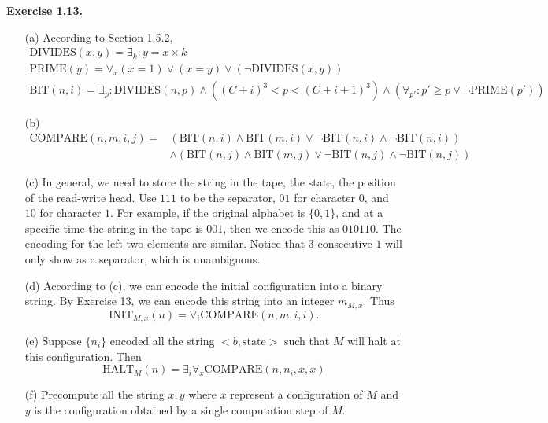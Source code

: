 \documentclass[a4paper]{article}
\newenvironment{exercise}[1]{
	\par
	\noindent\textbf{Exercise #1.}\quad
}{
	\par
	\bigskip
}
\newcommand{\bin}{\{0,1\}}
\begin{document}
\begin{exercise}{1.13}
	\begin{itemize}
		\item[(a)] According to Section 1.5.2, 
            \begin{gather*}
                \text{DIVIDES}(x,y)=\exists_k: y=x\times k\\
                \text{PRIME}(y)=\forall_x (x=1)\vee(x=y)\vee(\neg\text{DIVIDES}(x,y))\\
                \text{BIT}(n,i)=\exists_p: \text{DIVIDES}(n,p)\wedge ((C+i)^3<p<(C+i+1)^3) 
                \wedge (\forall_{p'}: p'\geq p\vee\neg\text{PRIME}(p'))
            \end{gather*}

		\item[(b)] 
            \begin{align*}
                \text{COMPARE}(n,m,i,j)=&(\text{BIT}(n,i)\wedge\text{BIT}(m,i)\vee\neg\text{BIT}(n,i)\wedge\neg\text{BIT}(n,i))\\
                &\wedge(\text{BIT}(n,j)\wedge\text{BIT}(m,j)\vee\neg\text{BIT}(n,j)\wedge\neg\text{BIT}(n,j))
            \end{align*}
	    \item[(c)] In general, we need to store the string in the tape, the state,
            the position of the read-write head. 
            Use $111$ to be the separator, $01$ for character $0$, and $10$ for character $1$. 
            For example, if the original alphabet is $\bin$, and at a specific time the string in the tape is $001$, 
            then we encode this as $010110$. The encoding for the left two elements are similar. 
            Notice that $3$ consecutive $1$ will only show as a separator, which is unambiguous.
        \item[(d)] According to (c), we can encode the initial configuration into a binary string. 
            By Exercise 13, we can encode this string into an integer $m_{M,x}$. 
            Thus 
            $$
            \text{INIT}_{M,x}(n)=\forall_i\text{COMPARE}(n,m,i,i).
            $$
        \item[(e)] Suppose $\{n_i\}$ encoded all the string $<b,\text{state}>$ such that $M$ will halt at this configuration. 
            Then 
            $$
            \text{HALT}_M(n)=\exists_i \forall_x\text{COMPARE}(n,n_i,x,x)
            $$   
        \item[(f)] Precompute all the string $x,y$ where $x$ represent a configuration of $M$ and 
            $y$ is the configuration obtained by a single computation step of $M$. 

\end{itemize}
\end{exercise}
\end{document}
